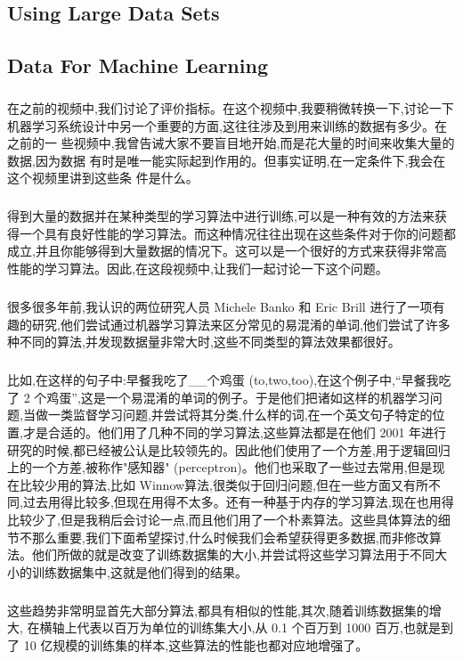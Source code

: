 \documentclass{article}
\begin{document}
\begin{CJK}{UTF8}{gbsn}
\section{Using Large Data Sets}
\subsection{Data For Machine Learning}
\subparagraph{}
在之前的视频中,我们讨论了评价指标。在这个视频中,我要稍微转换一下,讨论一下
机器学习系统设计中另一个重要的方面,这往往涉及到用来训练的数据有多少。在之前的一
些视频中,我曾告诫大家不要盲目地开始,而是花大量的时间来收集大量的数据,因为数据
有时是唯一能实际起到作用的。但事实证明,在一定条件下,我会在这个视频里讲到这些条
件是什么。
\subparagraph{}
得到大量的数据并在某种类型的学习算法中进行训练,可以是一种有效的方法来获得一个具有良好性能的学习算法。而这种情况往往出现在这些条件对于你的问题都成立,并且你能够得到大量数据的情况下。这可以是一个很好的方式来获得非常高性能的学习算法。因此,在这段视频中,让我们一起讨论一下这个问题。
\subparagraph{}
很多很多年前,我认识的两位研究人员 Michele Banko 和 Eric Brill 进行了一项有趣的研究,他们尝试通过机器学习算法来区分常见的易混淆的单词,他们尝试了许多种不同的算法,并发现数据量非常大时,这些不同类型的算法效果都很好。
\begin{figure}[H]
\label{fig:695}
\end{figure}
\subparagraph{}
比如,在这样的句子中:早餐我吃了\_{}\_{}个鸡蛋 (to,two,too),在这个例子中,“早餐我吃
了 2 个鸡蛋”,这是一个易混淆的单词的例子。于是他们把诸如这样的机器学习问题,当做一类监督学习问题,并尝试将其分类,什么样的词,在一个英文句子特定的位置,才是合适的。他们用了几种不同的学习算法,这些算法都是在他们 2001 年进行研究的时候,都已经被公认是比较领先的。因此他们使用了一个方差,用于逻辑回归上的一个方差,被称作"感知器" (perceptron)。他们也采取了一些过去常用,但是现在比较少用的算法,比如 Winnow算法,很类似于回归问题,但在一些方面又有所不同,过去用得比较多,但现在用得不太多。还有一种基于内存的学习算法,现在也用得比较少了,但是我稍后会讨论一点,而且他们用了一个朴素算法。这些具体算法的细节不那么重要,我们下面希望探讨,什么时候我们会希望获得更多数据,而非修改算法。他们所做的就是改变了训练数据集的大小,并尝试将这些学习算法用于不同大小的训练数据集中,这就是他们得到的结果。
\begin{figure}[H]
\label{fig:696}
\end{figure}
\subparagraph{}
这些趋势非常明显首先大部分算法,都具有相似的性能,其次,随着训练数据集的增大,
在横轴上代表以百万为单位的训练集大小,从 0.1 个百万到 1000 百万,也就是到了 10 亿规模的训练集的样本,这些算法的性能也都对应地增强了。

\end{CJK}
\end{document}
